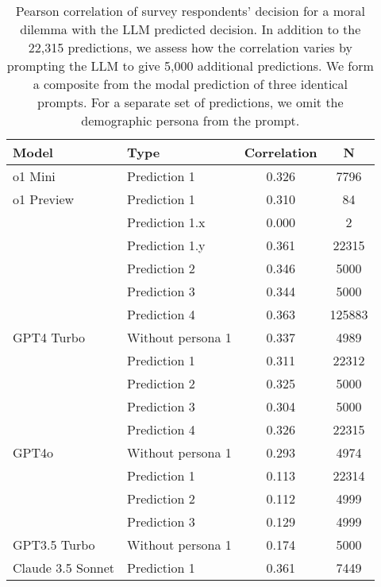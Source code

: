 \begin{table}[!h]
\centering
\caption{\label{tab:corr-tab}Pearson correlation of survey respondents' decision for a moral dilemma with the LLM predicted decision. In addition to the 22,315 predictions, we assess how the correlation varies by prompting the LLM to give 5,000 additional predictions. We form a composite from the modal prediction of three identical prompts. For a separate set of predictions, we omit the demographic persona from the prompt.}
\centering
\begin{tabular}[t]{llcc}
\toprule
Model & Type & Correlation & N\\
\midrule
o1 Mini & Prediction 1 & 0.326 & 7796\\
\cmidrule{1-4}
o1 Preview & Prediction 1 & 0.310 & 84\\
\cmidrule{1-4}
 & Prediction 1.x & 0.000 & 2\\
\cmidrule{2-4}
 & Prediction 1.y & 0.361 & 22315\\
\cmidrule{2-4}
 & Prediction 2 & 0.346 & 5000\\
\cmidrule{2-4}
 & Prediction 3 & 0.344 & 5000\\
\cmidrule{2-4}
 & Prediction 4 & 0.363 & 125883\\
\cmidrule{2-4}
\multirow{-6}{*}{\raggedright\arraybackslash GPT4 Turbo} & Without persona 1 & 0.337 & 4989\\
\cmidrule{1-4}
 & Prediction 1 & 0.311 & 22312\\
\cmidrule{2-4}
 & Prediction 2 & 0.325 & 5000\\
\cmidrule{2-4}
 & Prediction 3 & 0.304 & 5000\\
\cmidrule{2-4}
 & Prediction 4 & 0.326 & 22315\\
\cmidrule{2-4}
\multirow{-5}{*}{\raggedright\arraybackslash GPT4o} & Without persona 1 & 0.293 & 4974\\
\cmidrule{1-4}
 & Prediction 1 & 0.113 & 22314\\
\cmidrule{2-4}
 & Prediction 2 & 0.112 & 4999\\
\cmidrule{2-4}
 & Prediction 3 & 0.129 & 4999\\
\cmidrule{2-4}
\multirow{-4}{*}{\raggedright\arraybackslash GPT3.5 Turbo} & Without persona 1 & 0.174 & 5000\\
\cmidrule{1-4}
Claude 3.5 Sonnet & Prediction 1 & 0.361 & 7449\\
\bottomrule
\end{tabular}
\end{table}
